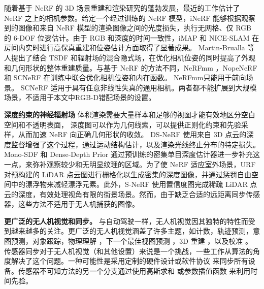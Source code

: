 随着基于 NeRF 的 3D 场景重建和渲染研究的蓬勃发展，最近的工作估计了 NeRF 之上的相机参数。给定一个经过训练的 NeRF 模型，iNeRF\cite{yen-chen_inerf_2021} 能够根据观察到的图像和来自 NeRF 模型的渲染图像之间的光度损失，执行无网格、仅 RGB 的 6-DOF 位姿估计。由于 RGB 和深度的时间一致性，iMAP\cite{sucar_imap_2021} 和 NICE-SLAM\cite{zhu_nice-slam_2022} 在房间内实时进行高保真重建和位姿估计方面取得了显著成果。 Martin-Brualla 等人提出了结合 TSDF 和辐射场的混合隐式场\cite{azinovic_neural_2022}，在优化相机位姿的同时提高了外观和几何形状的整体重建质量。与基于 NeRF 的方法不同，NeRFmm \cite{wang_nerf--_2022}，NopeNeRF\cite{bian_nope-nerf_2022} 和 SCNeRF \cite{jeong_self-calibrating_2021} 在训练中联合优化相机位姿和内在函数。 NeRFmm\cite{wang_nerf--_2022}只能用于前向场景。 SCNeRF\cite{jeong_self-calibrating_2021} 适用于具有任意非线性失真的通用相机。两者都不能扩展到大规模场景，不适用于本文中RGB-D错配场景的设置。

\textbf{深度约束的神经辐射场} 体积渲染需要大量样本和足够的视图才能有效地区分空白空间和不透明表面， 深度图可以作为几何线索，可以提供正则化约束和先验采样，从而加速 NeRF 向正确几何形状的收敛。 DS-NeRF \cite{deng_depth-supervised_2022} 使用来自 3D 点云的深度监督增强了这个过程，通过运动结构估计，以及渲染光线终止分布的特定损失。 Mono-SDF \cite{yu_monosdf_2022} 和 Dense-Depth Prior \cite{roessle_dense_2022} 通过预训练的密集单目深度估计器进一步补充这一点，来弥补观察较少和无明显纹理的区域。为了使 NeRF 适应室外场景，URF \cite{rematas_urban_2022} 对预构建的 LiDAR 点云图进行栅格化以生成密集的深度图像，并通过惩罚自由空间中的漂浮物来减轻漂浮元素。此外，S-NeRF \cite{xie_s-nerf_2023} 使用置信度图完成稀疏 LiDAR 点云的深度，有效处理视角有限的街景场景。然而，由于缺乏合适的远距离同步传感器，这些方法不适用于无人机捕获的图像。

\textbf{更广泛的无人机视觉和同步。} 与自动驾驶一样，无人机视觉因其独特的特性而受到越来越多的关注。更广泛的无人机视觉涵盖了许多主题，如计数\cite{wen2021detection}\cite{hsieh2017drone}，轨迹预测\cite{pellegrini2009you}，意图预测\cite{xie2013inferring}，对象跟踪\cite{mueller2016benchmark}，物理理解\cite{zeng2020visual} ，下一个最佳视图预测 \cite{guedon2023macarons}，3D 重建 \cite{zhang2017distributed}，以及校准 \cite{rahimi2016uav}。
传感器同步对于无人机视觉（和其他设置）来说是一个挑战，一些工作从算法的角度解决了这个问题。一种可能性是采用定制的硬件设计或软件协议 \cite{ansari_wireless_2019} 来同步所有设备。传感器不可知方法的另一个分支通过使用高斯求和 \cite{elhayek_spatio-temporal_2012} 或参数插值函数 \cite{yang_asynchronous_2021} 来利用时间先验。

